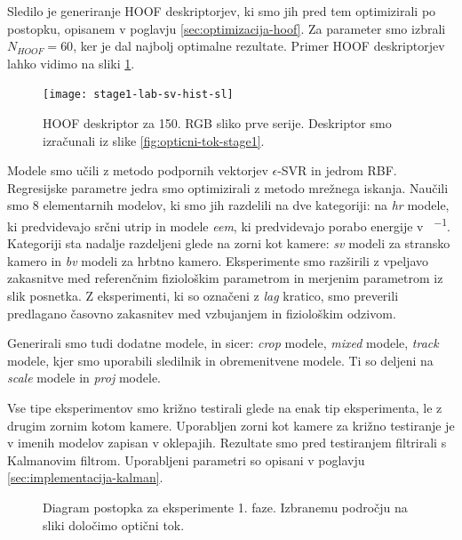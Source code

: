 Sledilo je generiranje HOOF deskriptorjev, ki smo jih pred tem optimizirali po postopku, opisanem v poglavju \ref{sec:optimizacija-hoof}. Za parameter smo izbrali $N_{HOOF} = 60 $, ker je dal najbolj optimalne rezultate. Primer HOOF deskriptorjev lahko vidimo na sliki \ref{fig:hoof-znacilke}.

\begin{figure}[!htb]
	\centering
	\texttt{[image: stage1-lab-sv-hist-sl]}
	\caption[HOOF deskriptor za 150. RGB sliko prve serije]{HOOF deskriptor za 150. RGB sliko prve serije. Deskriptor smo izračunali iz slike \ref{fig:opticni-tok-stage1}.}
	\label{fig:hoof-znacilke}
\end{figure}

Modele smo učili z metodo podpornih vektorjev $\epsilon$-SVR in jedrom RBF. Regresijske parametre jedra smo optimizirali z metodo mrežnega iskanja. Naučili smo \num{8} elementarnih modelov, ki smo jih razdelili na dve kategoriji: na \textit{hr} modele, ki predvidevajo srčni utrip in modele \textit{eem}, ki predvidevajo porabo energije v \si{\kcal\per\min}. Kategoriji sta nadalje razdeljeni glede na zorni kot kamere: \textit{sv} modeli za stransko kamero in \textit{bv} modeli za hrbtno kamero. Eksperimente smo razširili z vpeljavo zakasnitve med referenčnim fiziološkim parametrom in merjenim parametrom iz slik posnetka. Z eksperimenti, ki so označeni z \textit{lag} kratico, smo preverili predlagano časovno zakasnitev med vzbujanjem in fiziološkim odzivom. 

Generirali smo tudi dodatne modele, in sicer: \textit{crop} modele, \textit{mixed} modele, \textit{track} modele, kjer smo uporabili sledilnik in obremenitvene modele. Ti so deljeni na \textit{scale} modele in \textit{proj} modele.

Vse tipe eksperimentov smo križno testirali glede na enak tip eksperimenta, le z drugim zornim kotom kamere. Uporabljen zorni kot kamere za križno testiranje je v imenih modelov zapisan v oklepajih. Rezultate smo pred testiranjem filtrirali s Kalmanovim filtrom. Uporabljeni parametri so opisani v poglavju \ref{sec:implementacija-kalman}.


\begin{figure}[!htb]
	\centering
	\resizebox{\columnwidth}{!}{}
	\caption[Diagram postopka za eksperimente 1. faze]{Diagram postopka za eksperimente 1. faze. Izbranemu področju na sliki določimo optični tok.}
	\label{fig:diagram-procesiranja-stage1}
\end{figure}

